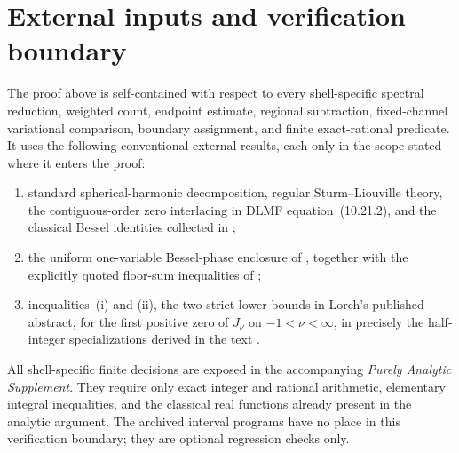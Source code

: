 \documentclass[11pt]{article}
\numberwithin{equation}{section}
\theoremstyle{definition}
\theoremstyle{remark}
\begin{document}
\appendix

\section{External inputs and verification boundary}
\label{app:external-boundary}

The proof above is self-contained with respect to every shell-specific
spectral reduction, weighted count, endpoint estimate, regional subtraction,
fixed-channel variational comparison, boundary assignment, and finite
exact-rational predicate.  It uses the following conventional external results, each only
in the scope stated where it enters the proof:
\begin{enumerate}
  \item standard spherical-harmonic decomposition, regular
        Sturm--Liouville theory, the contiguous-order zero interlacing
        in DLMF equation~(10.21.2), and the classical Bessel identities
        collected in \cite{DLMF};
  \item the uniform one-variable Bessel-phase enclosure of
        \cite{FLPSphase}, together with the explicitly quoted floor-sum
        inequalities of \cite{FLPSballs,FLPSannuli};
  \item inequalities~(i) and (ii), the two strict lower bounds in Lorch's
        published abstract, for the first positive zero of \(J_\nu\) on
        \(-1<\nu<\infty\), in precisely the half-integer specializations
        derived in the text \cite{Lorch1993}.
\end{enumerate}

All shell-specific finite decisions are exposed in the accompanying
\emph{Purely Analytic Supplement}.  They require only exact integer and
rational arithmetic, elementary integral inequalities, and the classical
real functions already present in the analytic argument.  The archived
interval programs have no place in this verification boundary; they are
optional regression checks only.
\end{document}
